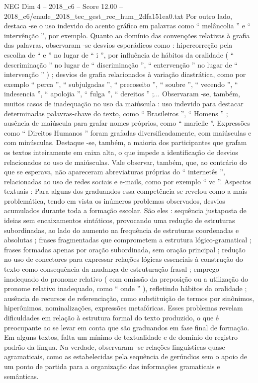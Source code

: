 \begin{textsample}{NEG Dim 4 – 2018\_c6 – Score 12.00 – 2018\_c6/enade\_2018\_tec\_gest\_rec\_hum\_2dfa151ea0.txt}
Por outro lado, destaca -se o uso indevido do acento gráfico em palavras como “ melâncolia ” e “ intervênção ”, por exemplo.
Quanto ao domínio das convenções relativas à grafia das palavras, observaram -se desvios esporádicos como : hipercorreção pela escolha de “ e ” no lugar de “ i ”, por influência de hábitos da oralidade ( “ descriminação ” no lugar de “ discriminação ”, “ entervenção ” no lugar de “ intervenção ” ) ; desvios de grafia relacionados à variação diastrática, como por exemplo “ perca ”, “ subjulgadas ”, “ precoseito ”, “ soubre ”, “ vecendo ”, “ indesencia ”, “ apolojia ”, “ fulga ”, “ dereitos ” ;...
Observaram -se, também, muitos casos de inadequação no uso da maiúscula : uso indevido para destacar determinadas palavras-chave do texto, como “ Brasileiros ”, “ Homens ” ; ausência de maiúscula para grafar nomes próprios, como “ marielle ”.
Expressões como “ Direitos Humanos ” foram grafadas diversificadamente, com maiúsculas e com minúsculas.
Destaque -se, também, a maioria dos participantes que grafam os textos inteiramente em caixa alta, o que impede a identificação de desvios relacionados ao uso de maiúsculas.
Vale observar, também, que, ao contrário do que se esperava, não apareceram abreviaturas próprias do “ internetês ”, relacionadas ao uso de redes sociais e e-mails, como por exemplo “ vc ”.
Aspectos textuais : Para alguns dos graduandos essa competência se revelou como a mais problemática, tendo em vista os inúmeros problemas observados, desvios acumulados durante toda a formação escolar.
São eles : sequência justaposta de ideias sem encaixamentos sintáticos, provocando uma redução de estruturas subordinadas, ao lado do aumento na frequência de estruturas coordenadas e absolutas ; frases fragmentadas que comprometem a estrutura lógico-gramatical ; frases formadas apenas por oração subordinada, sem oração principal ; redução no uso de conectores para expressar relações lógicas essenciais à construção do texto como consequência da mudança de estruturação frasal ; emprego inadequado do pronome relativo ( com omissão da preposição ou a utilização do pronome relativo inadequado, como “ onde ” ), refletindo hábitos da oralidade ; ausência de recursos de referenciação, como substituição de termos por sinônimos, hiperônimos, nominalizações, expressões metafóricas.
Esses problemas revelam dificuldades em relação à estrutura formal do texto produzido, o que é preocupante ao se levar em conta que são graduandos em fase final de formação.
Em alguns textos, falta um mínimo de textualidade e de domínio do registro padrão da língua.
Na verdade, observaram -se relações linguísticas quase agramaticais, como as estabelecidas pela sequência de gerúndios sem o apoio de um ponto de partida para a organização das informações gramaticais e semânticas.

\end{textsample}
